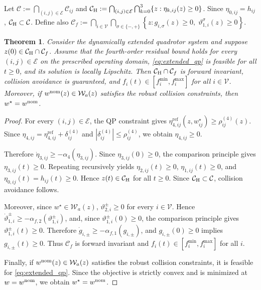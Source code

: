 \documentclass[journal,twoside,web]{ieeecolor}
\newtheorem{theorem}{Theorem}[section]
\begin{document}
Let $\mathcal C:=\bigcap_{(i,j)\in\mathcal E}\mathcal C_{ij}$ and
$\mathcal C_{\rm H}:=
\bigcap_{(i,j)\in\mathcal E}
\bigcap_{k=0}^{3}\{z:\eta_{k,ij}(z)\ge0\}$.
Since $\eta_{0,ij}=h_{ij}$,
$\mathcal C_{\rm H}\subset\mathcal C$. Define also
$\displaystyle{
\mathcal C_f:=
\bigcap_{i\in\mathcal V}
\bigcap_{\sigma\in\{-,+\}}
\left\{
z:g_{i,\sigma}(z)\ge0,\;
\vartheta_{1,i}^{\sigma}(z)\ge0
\right\}}$.


\begin{theorem}
\label{thm:sf_safety}
Consider the dynamically extended quadrotor system and suppose
$z(0)\in\mathcal C_{\rm H}\cap\mathcal C_f$.
Assume that the fourth-order residual bound holds for every
$(i,j)\in\mathcal E$ on the prescribed operating domain,
\eqref{eq:extended_qp} is feasible for all $t\geq0$, and its
solution is locally Lipschitz. Then
$\mathcal C_{\rm H}\cap\mathcal C_f$ is forward invariant,
collision avoidance is guaranteed, and
$f_i(t)\in[f_i^{\min},f_i^{\max}]$ for all
$i\in\mathcal V$. Moreover, if
$w^{\rm nom}(z)\in\mathcal W_a(z)$ satisfies the robust
collision constraints, then $w^\star=w^{\rm nom}$.
\end{theorem}

\begin{proof}
For every $(i,j)\in\mathcal E$, the QP constraint gives
$\eta_{4,ij}^{\mathrm{ref}}(z,w_{ij}^{\star})
\geq\rho_{ij}^{(4)}(z)$.
Since
$\eta_{4,ij}=\eta_{4,ij}^{\mathrm{ref}}+\delta_{ij}^{(4)}$
and $|\delta_{ij}^{(4)}|\leq\rho_{ij}^{(4)}$, we obtain
$\eta_{4,ij}\geq0$.

Therefore
$\dot\eta_{3,ij}\ge-\alpha_4(\eta_{3,ij})$.
Since $\eta_{3,ij}(0)\ge0$, the comparison principle gives
$\eta_{3,ij}(t)\ge0$. Repeating recursively yields
$\eta_{2,ij}(t)\ge0$, $\eta_{1,ij}(t)\ge0$, and
$\eta_{0,ij}(t)=h_{ij}(t)\ge0$.
Hence $z(t)\in\mathcal C_{\rm H}$ for all $t\ge0$.
Since $\mathcal C_{\rm H}\subset\mathcal C$, collision
avoidance follows.

Moreover, since $w^\star\in\mathcal W_a(z)$,
$\vartheta_{2,i}^{\pm}\ge0$ for every $i\in\mathcal V$.
Hence
$\dot\vartheta_{1,i}^{\pm}
\ge-\alpha_{f,2}(\vartheta_{1,i}^{\pm})$,
and, since $\vartheta_{1,i}^{\pm}(0)\ge0$, the comparison
principle gives $\vartheta_{1,i}^{\pm}(t)\ge0$.
Therefore
$\dot g_{i,\pm}\ge-\alpha_{f,1}(g_{i,\pm})$,
and $g_{i,\pm}(0)\ge0$ implies $g_{i,\pm}(t)\ge0$.
Thus $\mathcal C_f$ is forward invariant and
$f_i(t)\in[f_i^{\min},f_i^{\max}]$ for all $i$.

Finally, if $w^{\rm nom}(z)\in\mathcal W_a(z)$ satisfies the
robust collision constraints, it is feasible for
\eqref{eq:extended_qp}. Since the objective is strictly convex
and is minimized at $w=w^{\rm nom}$, we obtain
$w^\star=w^{\rm nom}$.
\end{proof}
\end{document}
